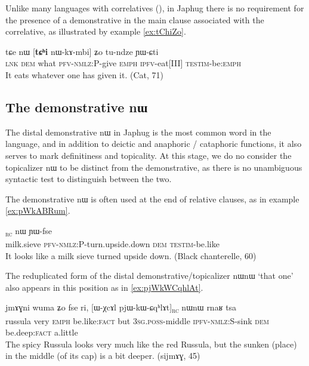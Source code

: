 \documentclass[oldfontcommands,oneside,a4paper,11pt]{article}
\newcommand{\ipa}[1]{{\phon #1}} %
\newcommand{\topic}{\textsc{dem}}
\newcommand{\tete}{\textsuperscript{\textsc{head}}}
\newcommand{\rc}{\textsubscript{\textsc{rc}}}
\begin{document}
Unlike many languages with correlatives   (\citealt{dayal96quantification}), in Japhug there is no requirement for the presence of a demonstrative  in the main clause  associated with the correlative, as illustrated by example  \ref{ex:tChiZo}.
 

\begin{exe}
\ex \label{ex:tChiZo}
\gll
\ipa{tɕe}  	\ipa{nɯ}  	[\textbf{\ipa{tɕʰi}}  	\ipa{nɯ-kɤ-mbi}]  	\ipa{ʑo}  	\ipa{tu-ndze}  	\ipa{ɲɯ-ɕti}  \\
\textsc{lnk} \textsc{dem} what \textsc{pfv-nmlz:P}-give \textsc{emph} \textsc{ipfv}-eat[III] \textsc{testim}-be:\textsc{emph} \\
\glt It eats whatever one has given it. (Cat, 71)
\end{exe}


\subsection{The demonstrative \ipa{nɯ}}

The distal demonstrative \ipa{nɯ} in Japhug is the  most common word in the language, and in addition to deictic  and anaphoric / cataphoric functions, it also serves to mark definitiness and topicality. At this stage, we do no consider the    topicalizer \ipa{nɯ} to be distinct from the demonstrative, as there is no unambiguous syntactic test to distinguish between the two.

The demonstrative \ipa{nɯ}  is often used at the end of relative clauses, as in example \ref{ex:pWkABRum}.

     \begin{exe}
   \ex \label{ex:pWkABRum}
 \gll
[\ipa{tɤlɤtsʰaʁ}\tete{}  	\ipa{pɯ-kɤ-βʁum}]\rc{}  	\ipa{nɯ}  	\ipa{ɲɯ-fse}  \\
milk.sieve \textsc{pfv-nmlz:P}-turn.upside.down \topic{} \textsc{testim}-be.like \\
\glt It looks like a milk sieve turned upside down. (Black chanterelle, 60)
\end{exe}

The reduplicated form of the distal demonstrative/topicalizer \ipa{nɯnɯ} `that one' also appears in this position as in   \ref{ex:pjWkWCqhlAt}.

     \begin{exe}
   \ex \label{ex:pjWkWCqhlAt}
 \gll
\ipa{jmɤɣni}   	\ipa{wuma}   	\ipa{ʑo}   	\ipa{fse}   	\ipa{ri,}   	[\ipa{ɯ-χcɤl}   	\ipa{pjɯ-kɯ-ɕqʰlɤt}]\rc{}   	\ipa{nɯnɯ}   	\ipa{rnaʁ}   	\ipa{tsa}    \\
russula very \textsc{emph} be.like:\textsc{fact} but \textsc{3sg.poss}-middle \textsc{ipfv-nmlz}:S-sink \topic{} be.deep:\textsc{fact} a.little \\
\glt The spicy Russula looks very much like the  red Russula, but the sunken (place) in the middle (of its cap) is a bit deeper. (sijmɤɣ, 45)
\end{exe}
\end{document}
